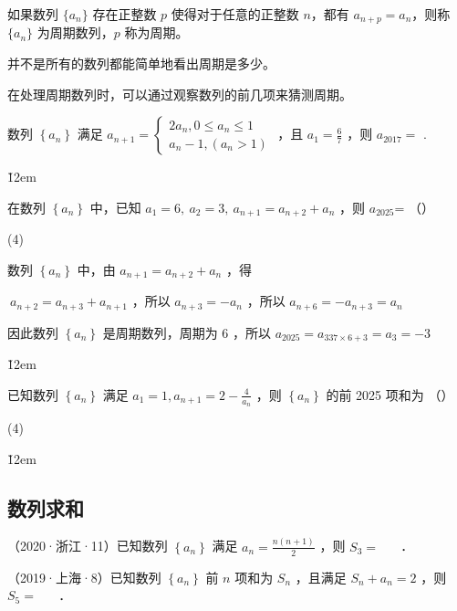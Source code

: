 \begin{theorem}
    如果数列 $\{a_n\}$ 存在正整数 $p$ 使得对于任意的正整数 $n$，都有 $a_{n+p} = a_n$，则称 $\{a_n\}$ 为周期数列，$p$ 称为周期。
\end{theorem}

\begin{tips}
    并不是所有的数列都能简单地看出周期是多少。

    在处理周期数列时，可以通过观察数列的前几项来猜测周期。
\end{tips}

\begin{example}
    数列 $\left\{a_n\right\}$ 满足 $a_{n+1}=\left\{\begin{array}{l}2 a_n, 0 \leq a_n \leq 1 \\ a_n-1,\left(a_n>1\right)\end{array}\right.$ ，且 $a_1=\frac{6}{7}$ ，则 $a_{2017}=$ \underline{\qquad}.
\end{example}

\v{12em}

\begin{example}
    在数列 $\left\{a_n\right\}$ 中，已知 $a_1=6, ~ a_2=3, ~ a_{n+1}=a_{n+2}+a_n$ ，则 $a_{2025}$= （\qquad）
    \begin{tasks}(4)
    \end{tasks}
\end{example}

\begin{solution}
    数列 $\left\{a_n\right\}$ 中，由 $a_{n+1}=a_{n+2}+a_n$ ，得

    $~ a_{n+2}=a_{n+3}+a_{n+1}$ ，所以 $a_{n+3}=-a_n$ ，所以 $a_{n+6}=-a_{n+3}=a_n$

    因此数列 $\left\{a_n\right\}$ 是周期数列，周期为 6 ，所以 $a_{2025}=a_{337 \times 6+3}=a_3=-3$
\end{solution}

\v{12em}

\begin{example}
    已知数列 $\left\{a_n\right\}$ 满足 $a_1=1, a_{n+1}=2-\frac{4}{a_n}$ ，则 $\left\{a_n\right\}$ 的前 2025 项和为 （\qquad）
    \begin{tasks}(4)
    \end{tasks}
\end{example}

\v{12em}

\subsection{数列求和}

\begin{example}
    （2020·浙江·11）已知数列 $\left\{a_n\right\}$ 满足 $a_n=\frac{n(n+1)}{2}$ ，则 $S_3=$ \underline{$\quad$} ．
\end{example}

\vspace{6em}

\begin{example}
    （2019·上海·8）已知数列 $\left\{a_n\right\}$ 前 $n$ 项和为 $S_n$ ，且满足 $S_n+a_n=2$ ，则 $S_5=$ \underline{$\quad$} ．
\end{example}

\vspace{6em}
